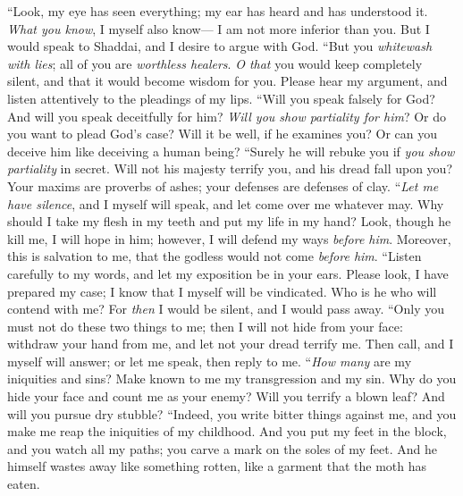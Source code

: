 \begin{biblechapter} %
 “Look, my eye has seen everything; 
my ear has heard and has understood it.
\verse \textit{What you know}, I myself also know— 
I am not more inferior than you.
\verse But I would speak to Shaddai, 
and I desire to argue with God.
\verse “But you \textit{whitewash with lies}; 
all of you are \textit{worthless healers}.
\verse \textit{O that} you would keep completely silent, 
and that it would become wisdom for you.
\verse Please hear my argument, 
and listen attentively to the pleadings of my lips.
\verse “Will you speak falsely for God? 
And will you speak deceitfully for him?
\verse \textit{Will you show partiality for him}? 
Or do you want to plead God’s case?
\verse Will it be well, if he examines you? 
Or can you deceive him like deceiving a human being?
\verse “Surely he will rebuke you 
if \textit{you show partiality} in secret.
\verse Will not his majesty terrify you, 
and his dread fall upon you?
\verse Your maxims are proverbs of ashes; 
your defenses are defenses of clay.
\verse “\textit{Let me have silence}, and I myself will speak, 
and let come over me whatever may.
\verse Why should I take my flesh in my teeth 
and put my life in my hand?
\verse Look, though he kill me, I will hope in him; 
however, I will defend my ways \textit{before him}.
\verse Moreover, this is salvation to me, 
that the godless would not come \textit{before him}.
\verse “Listen carefully to my words, 
and let my exposition be in your ears.
\verse Please look, I have prepared my case; 
I know that I myself will be vindicated.
\verse Who is he who will contend with me? 
For \textit{then} I would be silent, and I would pass away.
 “Only you must not do these two things to me; 
then I will not hide from your face:
\verse withdraw your hand from me, 
and let not your dread terrify me.
\verse Then call, and I myself will answer; 
or let me speak, then reply to me.
\verse “\textit{How many} are my iniquities and sins? 
Make known to me my transgression and my sin.
\verse Why do you hide your face 
and count me as your enemy?
\verse Will you terrify a blown leaf? 
And will you pursue dry stubble?
\verse “Indeed, you write bitter things against me, 
and you make me reap the iniquities of my childhood.
\verse And you put my feet in the block, 
and you watch all my paths; 
you carve a mark on the soles of my feet.
\verse And he himself wastes away like something rotten, 
like a garment that the moth has eaten.
\end{biblechapter}

